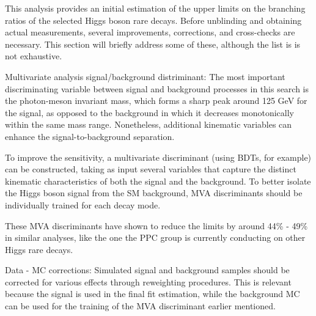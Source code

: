 This analysis provides an initial estimation of the upper limits on the branching ratios of the selected Higgs boson rare decays. Before unblinding and obtaining actual measurements, several improvements, corrections, and cross-checks are necessary. This section will briefly address some of these, although the list is is not exhaustive.
\vspace*{-6pt}
\begin{myitemlist}
    \item[Multivariate analysis signal/background distriminant:] The most important discriminating variable between signal and background processes in this search is the photon-meson invariant mass, which forms a sharp peak around 125 GeV for the signal, as opposed to the background in which it decreases monotonically within the same mass range. Nonetheless, additional kinematic variables can enhance the signal-to-background separation.
    
    To improve the sensitivity, a multivariate discriminant (using BDTs, for example) can be constructed, taking as input several variables that capture the distinct kinematic characteristics of both the signal and the background. To better isolate the Higgs boson signal from the SM background, MVA discriminants should be individually trained for each decay mode.

    These MVA discriminants have shown to reduce the limits by around 44\% - 49\% in similar analyses, like the one the PPC group is currently conducting on other Higgs rare decays.

    \item[Data - MC corrections:] Simulated signal and background samples should be corrected for various effects through reweighting procedures. This is relevant because the signal is used in the final fit estimation, while the background MC can be used for the training of the MVA discriminant earlier mentioned.
\iffalse
\end{myitemlist}
